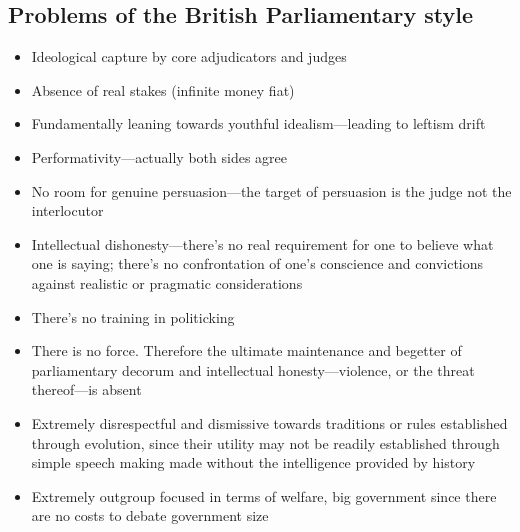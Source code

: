 

\subsection{Problems of the British Parliamentary style}

\begin{itemize}
    \item Ideological capture by core adjudicators and judges
    \item Absence of real stakes (infinite money fiat)
    \item Fundamentally leaning towards youthful idealism—leading to leftism drift
    \item Performativity—actually both sides agree 
    \item No room for genuine persuasion—the target of persuasion is the judge not the interlocutor
    \item Intellectual dishonesty—there's no real requirement for one to believe what one is saying; there's no confrontation of one's conscience and convictions against realistic or pragmatic considerations
    \item There's no training in politicking
    \item There is no force. Therefore the ultimate maintenance and begetter of parliamentary decorum and intellectual honesty—violence, or the threat thereof—is absent
    \item Extremely disrespectful and dismissive towards traditions or rules established through evolution, since their utility may not be readily established through simple speech making made without the intelligence provided by history 
    
    \item Extremely outgroup focused in terms of welfare, big government since there are no costs to debate government size
    
\end{itemize}


